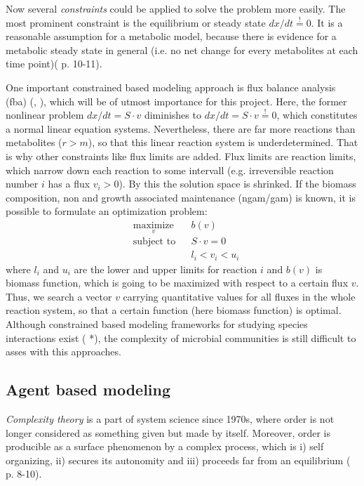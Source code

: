 Now several \textit{constraints} could be applied to solve the problem more easily. The most prominent constraint is the equilibrium or steady state $dx/dt \stackrel{!}{=}0$.
It is a reasonable assumption for a metabolic model, because there is evidence for a metabolic steady state in general (i.e. no net change for every metabolites at each time point)(\cite{Harris1995} p. 10-11).

One important constrained based modeling approach is flux balance analysis (fba) (\cite{Varma1994}, \cite{Orth2010}), which will be of utmost importance for this project.
Here, the former nonlinear problem $dx/dt=S\cdot v$ diminishes to $dx/dt=S\cdot v \stackrel{!}{=}0$, which constitutes a normal linear equation systems.
Nevertheless, there are far more reactions than metabolites ($r>m$), so that this linear reaction system is underdetermined.
That is why other constraints like flux limits are added.
Flux limits are reaction limits, which narrow down each reaction to some intervall (e.g. irreversible reaction number $i$ has a flux $v_i>0$).
By this the solution space is shrinked.
If the biomass composition, non and growth associated maintenance (ngam/gam) is known, it is possible to formulate an optimization problem:
\begin{equation*}
  \begin{aligned}
    & \underset{v}{\text{maximize}} & & b(v) \\
    & \text{subject to} & & S \cdot v = 0 \\
    & & & l_i < v_i < u_i
  \end{aligned}
\end{equation*}
where $l_i$ and $u_i$ are the lower and upper limits for reaction $i$ and $b(v)$ is biomass function, which is going to be maximized with respect to a certain flux $v$.
Thus, we search a vector $v$ carrying quantitative values for all fluxes in the whole reaction system, so that a certain function (here biomass function) is optimal. Although constrained based modeling frameworks for studying species interactions exist ( *), the complexity of microbial communities is still difficult to asses with this approaches.

\subsection{Agent based modeling}
\textit{Complexity theory} is a part of system science since 1970s, where order is not longer considered as something given but made by itself. Moreover, order is producible as a surface phenomenon by a complex process, which is i) self organizing, ii) secures its autonomity and iii) proceeds far from an equilibrium (\cite{Cilliers2007} p. 8-10).

